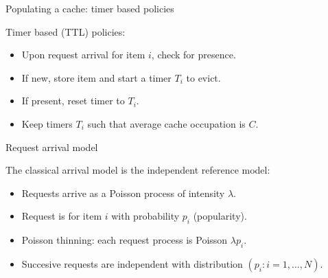 \documentclass[aspectratio=169]{beamer}
\newenvironment*{myitem}[1][1.5em]{\begin{itemize}\setlength{\itemsep}{#1}}{\end{itemize}}
\begin{document}
\begin{frame}{Populating a cache: timer based policies}
	
\alert{Timer based (TTL) policies:}\vfill

\begin{myitem}[1em]
	\item Upon request arrival for item $i$, check for presence.
	\item If new, store item and start a \alert{timer} $T_i$ to evict.
	\item If present, reset timer to $T_i$.
	\item Keep timers $T_i$ such that \alert{average} cache occupation is $C$.
\end{myitem}

\vspace{1.5em}

\centering

\end{frame}


		

	



\begin{frame}{Request arrival model}
	
	The classical arrival model is the \alert{independent reference model}:

	\vfill

	\begin{myitem}
		\item Requests arrive as a Poisson process of intensity $\lambda$.
		\item Request is for item $i$ with probability $p_i$ (popularity).
		\item Poisson thinning: each request process is Poisson $\lambda p_i$.
		\item Succesive requests are \alert{independent} with distribution $(p_i: i=1,\ldots,N)$.
	\end{myitem}
\end{frame}
\end{document}
